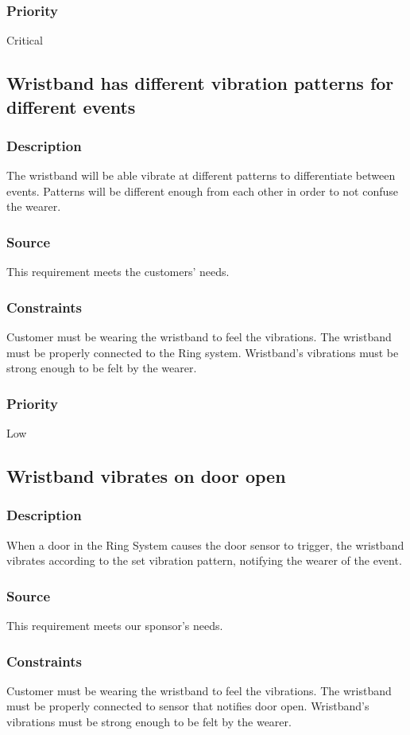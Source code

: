 \subsubsection{Priority}
Critical

\subsection{Wristband has different vibration patterns for different events}
\subsubsection{Description}
The wristband will be able vibrate at different patterns to differentiate between events. Patterns will be different enough from each other in order to not confuse the wearer.
\subsubsection{Source}
This requirement meets the customers' needs.
\subsubsection{Constraints}
Customer must be wearing the wristband to feel the vibrations.
The wristband must be properly connected to the Ring system. Wristband's vibrations must be strong enough to be felt by the wearer.
\subsubsection{Priority}
Low

\subsection{Wristband vibrates on door open}
\subsubsection{Description}
When a door in the Ring System causes the door sensor to trigger, the wristband vibrates according to the set vibration pattern, notifying the wearer of the event.
\subsubsection{Source}
This requirement meets our sponsor's needs.
\subsubsection{Constraints}
Customer must be wearing the wristband to feel the vibrations.
The wristband must be properly connected to sensor that notifies door open. Wristband's vibrations must be strong enough to be felt by the wearer.
